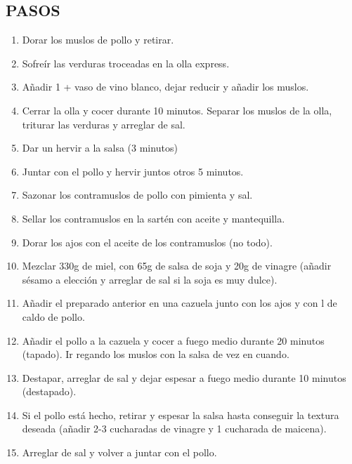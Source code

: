 \subsection*{PASOS}
\begin{enumerate}
    \item Dorar los muslos de pollo y retirar.
    \item Sofreír las verduras troceadas en la olla express.
    \item Añadir 1 +  vaso de vino blanco, dejar reducir y añadir los muslos.
    \item Cerrar la olla y cocer durante 10 minutos. Separar los muslos de la olla, triturar las verduras y arreglar de sal.
    \item Dar un hervir a la salsa (3 minutos)
    \item Juntar con el pollo y hervir juntos otros 5 minutos.
    \item Sazonar los contramuslos de pollo con pimienta y sal.
    \item Sellar los contramuslos en la sartén con aceite y mantequilla.
    \item Dorar los ajos con el aceite de los contramuslos (no todo).
    \item Mezclar 330g de miel, con 65g de salsa de soja y 20g de vinagre (añadir sésamo a elección y arreglar de sal si la soja es muy dulce).
    \item Añadir el preparado anterior en una cazuela junto con los ajos y con  l de caldo de pollo.
    \item Añadir el pollo a la cazuela y cocer a fuego medio durante 20 minutos (tapado). Ir regando los muslos con la salsa de vez en cuando.
    \item Destapar, arreglar de sal y dejar espesar a fuego medio durante 10 minutos (destapado).
    \item Si el pollo está hecho, retirar y espesar la salsa hasta conseguir la textura deseada (añadir 2-3 cucharadas de vinagre y 1 cucharada de maicena).
    \item Arreglar de sal y volver a juntar con el pollo.
\end{enumerate}